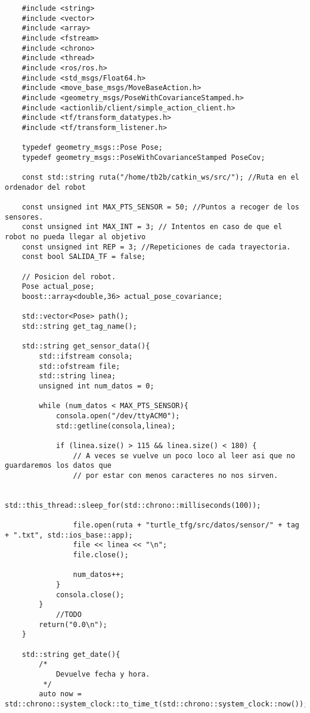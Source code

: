 \begin{lstlisting}
    #include <string>
    #include <vector>
    #include <array>
    #include <fstream>
    #include <chrono>
    #include <thread>
    #include <ros/ros.h>
    #include <std_msgs/Float64.h>
    #include <move_base_msgs/MoveBaseAction.h>
    #include <geometry_msgs/PoseWithCovarianceStamped.h>
    #include <actionlib/client/simple_action_client.h>
    #include <tf/transform_datatypes.h>
    #include <tf/transform_listener.h>
    
    typedef geometry_msgs::Pose Pose;
    typedef geometry_msgs::PoseWithCovarianceStamped PoseCov;
    
    const std::string ruta("/home/tb2b/catkin_ws/src/"); //Ruta en el ordenador del robot
    
    const unsigned int MAX_PTS_SENSOR = 50; //Puntos a recoger de los sensores.
    const unsigned int MAX_INT = 3; // Intentos en caso de que el robot no pueda llegar al objetivo
    const unsigned int REP = 3; //Repeticiones de cada trayectoria.
    const bool SALIDA_TF = false;
    
    // Posicion del robot.
    Pose actual_pose;
    boost::array<double,36> actual_pose_covariance;
    
    std::vector<Pose> path();
    std::string get_tag_name();
    
    std::string get_sensor_data(){
        std::ifstream consola;
        std::ofstream file; 
        std::string linea;
        unsigned int num_datos = 0;
    
        while (num_datos < MAX_PTS_SENSOR){
            consola.open("/dev/ttyACM0");
            std::getline(consola,linea);
    
            if (linea.size() > 115 && linea.size() < 180) {
                // A veces se vuelve un poco loco al leer asi que no guardaremos los datos que 
                // por estar con menos caracteres no nos sirven.
                
                std::this_thread::sleep_for(std::chrono::milliseconds(100));
    
                file.open(ruta + "turtle_tfg/src/datos/sensor/" + tag + ".txt", std::ios_base::app);
                file << linea << "\n";
                file.close();
            
                num_datos++;
            }
            consola.close();
        }
            //TODO
        return("0.0\n");
    }
    
    std::string get_date(){
        /*
            Devuelve fecha y hora.
         */
        auto now = std::chrono::system_clock::to_time_t(std::chrono::system_clock::now());
    

\end{lstlisting}
